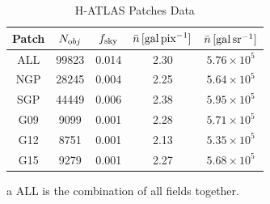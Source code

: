 
\begin{table}[t]
\centering
\caption{H-ATLAS Patches Data\label{herschel_patches_xc1}}
\begin{threeparttable}
\begin{tabular}{ccccc}
\toprule
\midrule
Patch & $N_{\rm obj}$ & $f_{\rm{sky}}$ & $\bar{n}\,[\hbox{gal}\,\hbox{pix}^{-1}]$ & $\bar{n}\,[\hbox{gal}\,\hbox{sr}^{-1}]$\\
\midrule
ALL\tnote{a}  &   99823 &   0.014   &    2.30    &    $5.76\times 10^5$ \\
NGP  &   28245 &   0.004   &    2.25    &    $5.64\times 10^5$ \\
SGP  &   44449 &   0.006   &    2.38    &    $5.95\times 10^5$ \\
G09   &   9099   &   0.001   &    2.28    &    $5.71\times 10^5$ \\
G12   &   8751   &   0.001   &    2.13    &    $5.35\times 10^5$ \\
G15   &   9279   &   0.001   &    2.27    &    $5.68\times 10^5$ \\
\bottomrule
\end{tabular}
\begin{tablenotes}
\item[a] ALL is the combination of all fields together.
\end{tablenotes}
\end{threeparttable}
\end{table}

